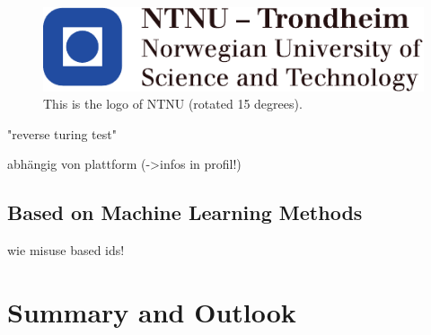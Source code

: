 \begin{figure}
	\centering
	\includegraphics[scale=0.6,angle=15]{fig/NTNU}
	\caption{This is the logo of NTNU (rotated 15 degrees).}
	\label{fig1}
\end{figure}



"reverse turing test"

abhängig von plattform (->infos in profil!)
\subsection{Based on Machine Learning Methods}
wie misuse based ids!

\section{Summary and Outlook}


























\newpage